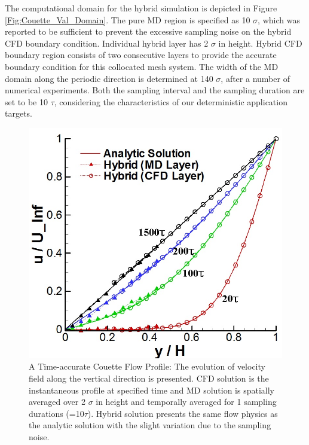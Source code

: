 \documentclass[]{aiaa-tc}%
\begin{document}
The computational domain for the hybrid simulation is depicted in Figure
\ref{Fig:Couette_Val_Domain}. The pure MD region is specified as 10 $\sigma$, 
which was reported to be sufficient to prevent the excessive sampling noise
on the hybrid CFD boundary condition.\cite{Yen} Individual hybrid layer has
2 $\sigma$ in height. Hybrid CFD boundary region consists of two consecutive 
layers to provide the accurate boundary condition for this collocated mesh system.
The width of the MD domain along the periodic direction is determined at 140 
$\sigma$, after a number of numerical experiments.
Both the sampling interval and the sampling duration are set to be 10 $\tau$,
considering the characteristics of our deterministic application targets. 


\begin{figure}
\includegraphics{Flat_Plate_Sol2.jpg}
\caption{A Time-accurate Couette Flow Profile: The evolution of velocity field 
along the vertical direction is presented. CFD solution is the instantaneous 
profile at specified time and MD solution is spatially averaged over 
2 $\sigma$ in height and temporally averaged for 1 sampling durations (=10$\tau$).
Hybrid solution presents the same flow physics as the analytic solution
with the slight variation due to the sampling noise.}
\label{Fig:Flat_Plate_Sol}
\end{figure}
\end{document}
